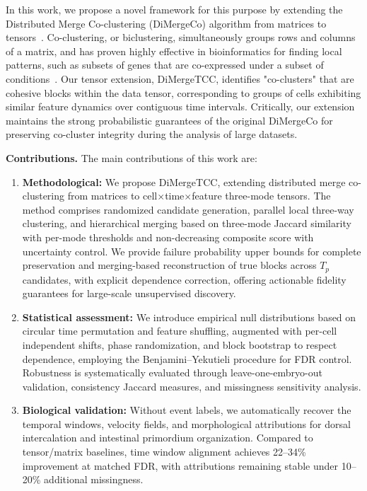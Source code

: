 \documentclass[unnumsec,webpdf,modern,large,namedate]{oup-authoring-template}%
\theoremstyle{thmstyleone}\newtheorem{theorem}{Theorem}
\theoremstyle{thmstyletwo}\newtheorem{example}{Example}
\theoremstyle{thmstylethree}\newtheorem{definition}{Definition}
\begin{document}
In this work, we propose a novel framework for this purpose by extending the Distributed Merge Co-clustering (DiMergeCo) algorithm from matrices to tensors~\citep{wu2024scalable}. Co-clustering, or biclustering, simultaneously groups rows and columns of a matrix, and has proven highly effective in bioinformatics for finding local patterns, such as subsets of genes that are co-expressed under a subset of conditions~\citep{hartigan1972DirectClusteringData,madeira2004BiclusteringAlgorithmsBiological}. Our tensor extension, DiMergeTCC, identifies "co-clusters" that are cohesive blocks within the data tensor, corresponding to groups of cells exhibiting similar feature dynamics over contiguous time intervals. Critically, our extension maintains the strong probabilistic guarantees of the original DiMergeCo for preserving co-cluster integrity during the analysis of large datasets.

\textbf{Contributions.} The main contributions of this work are:
\begin{enumerate}
\item \textbf{Methodological:} We propose DiMergeTCC, extending distributed merge co-clustering from matrices to cell$\times$time$\times$feature three-mode tensors. The method comprises randomized candidate generation, parallel local three-way clustering, and hierarchical merging based on three-mode Jaccard similarity with per-mode thresholds and non-decreasing composite score with uncertainty control. We provide failure probability upper bounds for complete preservation and merging-based reconstruction of true blocks across $T_p$ candidates, with explicit dependence correction, offering actionable fidelity guarantees for large-scale unsupervised discovery.
\item \textbf{Statistical assessment:} We introduce empirical null distributions based on circular time permutation and feature shuffling, augmented with per-cell independent shifts, phase randomization, and block bootstrap to respect dependence, employing the Benjamini--Yekutieli procedure for FDR control. Robustness is systematically evaluated through leave-one-embryo-out validation, consistency Jaccard measures, and missingness sensitivity analysis.
\item \textbf{Biological validation:} Without event labels, we automatically recover the temporal windows, velocity fields, and morphological attributions for dorsal intercalation and intestinal primordium organization. Compared to tensor/matrix baselines, time window alignment achieves 22--34\% improvement at matched FDR, with attributions remaining stable under 10--20\% additional missingness.
\end{enumerate}
\end{document}

